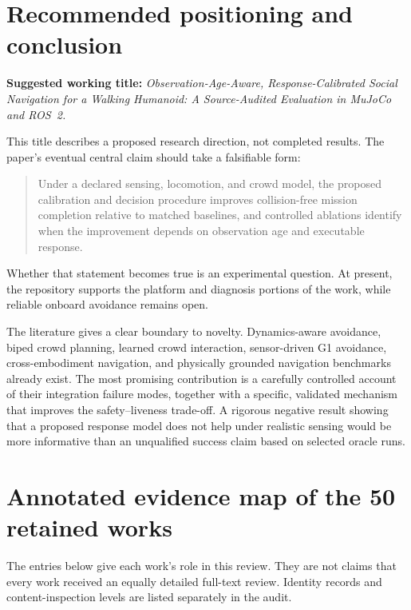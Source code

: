 \documentclass[11pt,a4paper]{article}
\begin{document}


\section{Recommended positioning and conclusion}
\textbf{Suggested working title:}
\emph{Observation-Age-Aware, Response-Calibrated Social Navigation for a
Walking Humanoid: A Source-Audited Evaluation in MuJoCo and ROS~2.}

This title describes a proposed research direction, not completed results.
The paper's eventual central claim should take a falsifiable form:
\begin{quote}
Under a declared sensing, locomotion, and crowd model, the proposed
calibration and decision procedure improves collision-free mission
completion relative to matched baselines, and controlled ablations identify
when the improvement depends on observation age and executable response.
\end{quote}
Whether that statement becomes true is an experimental question. At present,
the repository supports the platform and diagnosis portions of the work,
while reliable onboard avoidance remains open.

The literature gives a clear boundary to novelty. Dynamics-aware avoidance,
biped crowd planning, learned crowd interaction, sensor-driven G1 avoidance,
cross-embodiment navigation, and physically grounded navigation benchmarks
already exist. The most promising contribution is a carefully controlled
account of their integration failure modes, together with a specific,
validated mechanism that improves the safety--liveness trade-off. A rigorous
negative result showing that a proposed response model does not help under
realistic sensing would be more informative than an unqualified success
claim based on selected oracle runs.

\appendix
\section{Annotated evidence map of the 50 retained works}
\label{app:evidence}
The entries below give each work's role in this review. They are not claims
that every work received an equally detailed full-text review. Identity
records and content-inspection levels are listed separately in the audit.
\end{document}
